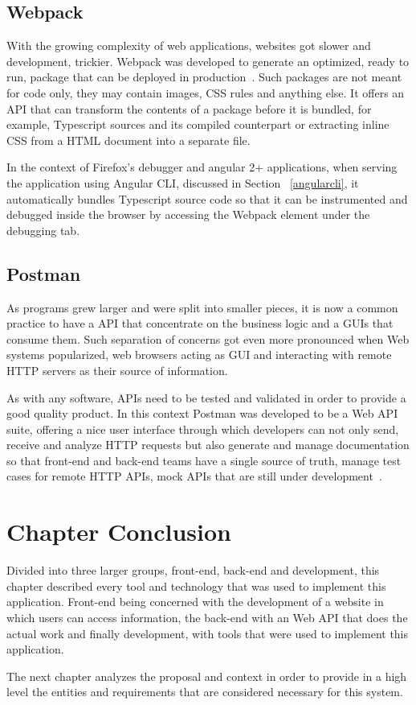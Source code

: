 \subsection{Webpack}
With the growing complexity of web applications, websites got slower and development, trickier. Webpack was developed to generate an optimized, ready to run, package that can be deployed in production~\cite{webpack}. Such packages are not meant for code only, they may contain images, \gls{CSS} rules and anything else. It offers an \gls{API} that can transform the contents of a package before it is bundled, for example, Typescript sources and its compiled counterpart or extracting inline \gls{CSS} from a \gls{HTML} document into a separate file.

In the context of Firefox's debugger and angular 2+ applications, when serving the application using Angular \gls{CLI}, discussed in Section ~\ref{angularcli}, it automatically bundles Typescript source code so that it can be instrumented and debugged inside the browser by accessing the Webpack element under the debugging tab.

\subsection{Postman}
As programs grew larger and were split into smaller pieces, it is now a common practice to have a \gls{API} that concentrate on the business logic and a \gls{GUI}s that consume them. Such separation of concerns got even more pronounced when Web systems popularized, web browsers acting as \gls{GUI} and interacting with remote \gls{HTTP} servers as their source of information.

As with any software, \gls{API}s need to be tested and validated in order to provide a good quality product. In this context Postman was developed to be a Web \gls{API} suite, offering a nice user interface through which developers can not only send, receive and analyze \gls{HTTP} requests but also generate and manage documentation so that front-end and back-end teams have a single source of truth, manage test cases for remote \gls{HTTP} \gls{API}s, mock \gls{API}s that are still under development~\cite{postman}.

\section{Chapter Conclusion}

Divided into three larger groups, front-end, back-end and development, this chapter described every tool and technology that was used to implement this application. Front-end being concerned with the development of a website in which users can access information, the back-end with an Web \gls{API} that does the actual work and finally development, with tools that were used to implement this application.

The next chapter analyzes the proposal and context in order to provide in a high level the entities and requirements that are considered necessary for this system.